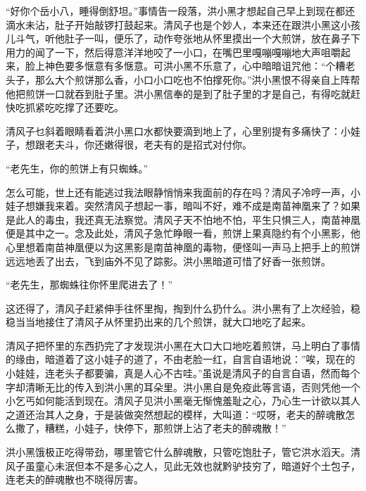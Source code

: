“好你个岳小八，睡得倒舒坦。”事情告一段落，洪小黑才想起自己早上到现在都还滴水未沾，肚子开始敲锣打鼓起来。清风子也是个妙人，本来还在跟洪小黑这小孩儿斗气，听他肚子一叫，便乐了，动作夸张地从怀里摸出一个大煎饼，放在鼻子下用力的闻了一下，然后得意洋洋地咬了一小口，在嘴巴里嘎嘣嘎嘣地大声咀嚼起来，脸上神色要多惬意有多惬意。可洪小黑不乐意了，心中暗暗诅咒他：“个糟老头子，那么大个煎饼那么香，小口小口吃也不怕撑死你。”洪小黑恨不得亲自上阵帮他把煎饼一口就吞到肚子里。洪小黑信奉的是到了肚子里的才是自己，有得吃就赶快吃抓紧吃吃撑了还要吃。

清风子乜斜着眼睛看着洪小黑口水都快要滴到地上了，心里别提有多痛快了：小娃子，想跟老夫斗，你还嫩得很，老夫有的是招式对付你。

“老先生，你的煎饼上有只蜘蛛。”

怎么可能，世上还有能逃过我法眼静悄悄来我面前的存在吗？清风子冷哼一声，小娃子想嫌我来着。突然清风子想起一事，暗叫不好，难不成是南苗神凰来了？如果是此人的毒虫，我还真无法察觉。清风子天不怕地不怕，平生只惧三人，南苗神凰便是其中之一。念及此处，清风子急忙睁眼一看，煎饼上果真隐约有个小黑影，他心里想着南苗神凰便以为这黑影是南苗神凰的毒物，便怪叫一声马上把手上的煎饼远远地丢了出去，飞到庙外不见了踪影。洪小黑暗道可惜了好香一张煎饼。

“老先生，那蜘蛛往你怀里爬进去了！”

这还得了，清风子赶紧伸手往怀里掏，掏到什么扔什么。洪小黑有了上次经验，稳稳当当地接住了清风子从怀里扔出来的几个煎饼，就大口地吃了起来。

清风子把怀里的东西扔完了才发现洪小黑在大口大口地吃着煎饼，马上明白了事情的缘由，暗道着了这小娃子的道了，不由老脸一红，自言自语地说：”唉，现在的小娃娃，连老头子都要骗，真是人心不古哇。”虽说是清风子的自言自语，然而每个字却清晰无比的传入到洪小黑的耳朵里。洪小黑自是免疫此等言语，否则凭他一个小乞丐如何能活到现在。清风子见洪小黑毫无惭愧羞耻之心，乃心生一计欲以其人之道还治其人之身，于是装做突然想起的模样，大叫道：“哎呀，老夫的醉魂散怎么撒了，糟糕，小娃子，快停下，那煎饼上沾了老夫的醉魂散！”

洪小黑饿极正吃得带劲，哪里管它什么醉魂散，只管吃饱肚子，管它洪水滔天。清风子虽童心未泯但本不是多心之人，见此无效也就黔驴技穷了，暗道好个土包子，连老夫的醉魂散也不晓得厉害。